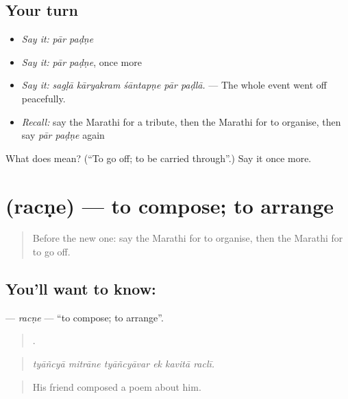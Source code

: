 \subsection*{Your turn}
\begin{itemize}
\raggedright
  \item \emph{Say it:} \emph{pār paḍṇe}
  \item \emph{Say it:} \emph{pār paḍṇe}, once more
  \item \emph{Say it:} \emph{sagḷā kāryakram śāntapṇe pār paḍlā.} — The whole event went off peacefully.
  \item \emph{Recall:} say the Marathi for a tribute, then the Marathi for to organise, then say \emph{pār paḍṇe} again
\end{itemize}

\begin{tcolorbox}[breakable,colback=teal!4,colframe=teal!35!black,title={Before you move on}]
What does   mean? (\textquotedblleft{}To go off; to be carried through\textquotedblright{}.) Say it once more.
\end{tcolorbox}
\section[\texorpdfstring{\mr{रचणे} (racṇe)}{रचणे (racṇe)}]{ (racṇe) — to compose; to arrange}

\label{lesson:MR-C324-racne}



\begin{quote}
Before the new one: say the Marathi for to organise, then the Marathi for to go off.
\end{quote}

\subsection*{You'll want to know: }
\textbf{} — \emph{racṇe} — \textquotedblleft{}to compose; to arrange\textquotedblright{}.

\begin{quote}
     .
\end{quote}

\begin{quote}
\emph{tyāñcyā mitrāne tyāñcyāvar ek kavitā raclī.}
\end{quote}

\begin{quote}
His friend composed a poem about him.
\end{quote}

